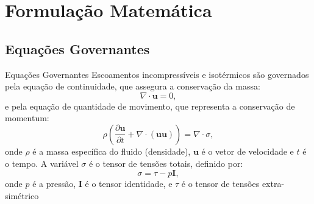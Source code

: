 \section{Formulação Matemática}

\subsection{Equações Governantes}

\begin{frame}{Equações Governantes}
Escoamentos incompressíveis e isotérmicos são governados pela equação de continuidade, que assegura a conservação da massa:
\begin{equation}\label{eq_conservacao_massa}
    \nabla \cdot \mathbf{u} = 0,
\end{equation}
e pela equação de quantidade de movimento, que representa a conservação de momentum:
\begin{equation}\label{eq_conservacao_momentum}
    \rho \left( \frac{\partial \mathbf{u}}{\partial t} + \nabla \cdot (\mathbf{u} \mathbf{u}) \right) = \nabla \cdot \sigma,
\end{equation}
onde $\rho$ é a massa específica do fluido (densidade), $\mathbf{u}$ é o vetor de velocidade e $t$ é o tempo. A variável $\sigma$ é o tensor de tensões totais, definido por:
\begin{equation}\label{eq_tensoes_totais}
    \sigma = \tau - p \mathbf{I},
\end{equation}
onde $p$ é a pressão, $\mathbf{I}$ é o tensor identidade, e $\tau$ é o tensor de tensões extra-simétrico
\end{frame}

